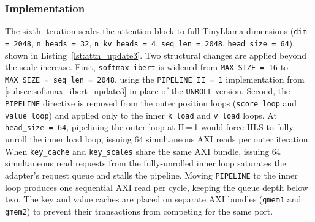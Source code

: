 \subsubsection{Implementation}
\label{subsubsec:attn_update3_impl}

The sixth iteration scales the attention block to full TinyLlama dimensions
(\texttt{dim\,=\,2048}, \texttt{n\_heads\,=\,32}, \texttt{n\_kv\_heads\,=\,4},
\texttt{seq\_len\,=\,2048}, \texttt{head\_size\,=\,64}), shown in
Listing~\ref{lst:attn_update3}. Two structural changes are applied beyond
the scale increase. First, \texttt{softmax\_ibert} is widened from
\texttt{MAX\_SIZE\,=\,16} to \texttt{MAX\_SIZE\,=\,seq\_len\,=\,2048},
using the \texttt{PIPELINE II\,=\,1} implementation from
\cref{subsec:softmax_ibert_update3} in place of the \texttt{UNROLL} version.
Second, the \texttt{PIPELINE} directive is removed from the outer position
loops (\texttt{score\_loop} and \texttt{value\_loop}) and applied only to the
inner \texttt{k\_load} and \texttt{v\_load} loops. At \texttt{head\_size\,=\,64},
pipelining the outer loop at II\,=\,1 would force HLS to fully unroll the
inner load loop, issuing 64 simultaneous AXI reads per outer iteration.
When \texttt{key\_cache} and \texttt{key\_scales} share the same AXI
bundle, issuing 64 simultaneous read requests from the fully-unrolled inner
loop saturates the adapter's request queue and stalls the pipeline. Moving
\texttt{PIPELINE} to the inner loop produces one sequential AXI read per
cycle, keeping the queue depth below two.
The key and value caches are placed on separate AXI bundles
(\texttt{gmem1} and \texttt{gmem2}) to prevent their transactions
from competing for the same port.

